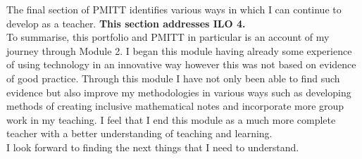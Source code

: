 \documentclass[a4paper,12pt]{article}
\begin{document}
The final section of PMITT identifies various ways in which I can continue to develop as a teacher. \textbf{This section addresses ILO 4.}\\

To summarise, this portfolio and PMITT in particular is an account of my journey through Module 2. I began this module having already some experience of using technology in an innovative way however this was not based on evidence of good practice. Through this module I have not only been able to find such evidence but also improve my methodologies in various ways such as developing methods of creating inclusive mathematical notes and incorporate more group work in my teaching. I feel that I end this module as a much more complete teacher with a better understanding of teaching and learning.\\

I look forward to finding the next things that I need to understand.
\end{document}
